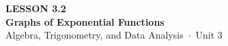 \documentclass[aspectratio=169, 11pt]{beamer}
\begin{document}
{
\begin{frame}[plain]
  \vspace{2.8cm}\hspace{0.55cm}%
  \begin{minipage}{0.9\textwidth}
    {\color{goldacc}\bfseries\small LESSON 3.2}\\[0.5cm]
    {\color{white}\bfseries\LARGE Graphs of Exponential Functions}\\[1.2cm]
    {\color{mistmid}\small Algebra, Trigonometry, and Data Analysis~$\cdot$~Unit 3}
  \end{minipage}
\end{frame}
}

\begin{frame}[t, plain]
\end{frame}
\end{document}
